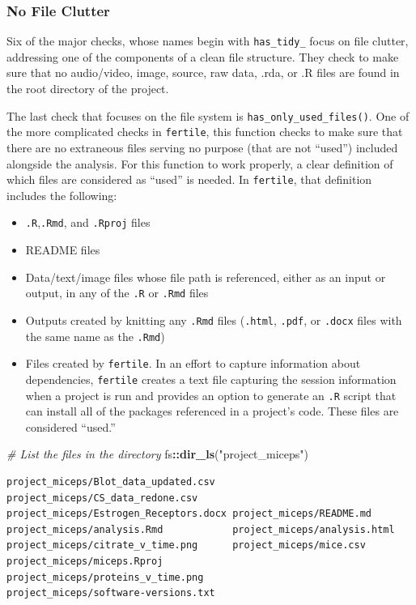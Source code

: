 \documentclass[12pt,twoside]{reedthesis}
\newenvironment{Shaded}{\begin{snugshade}}{\end{snugshade}}
\newcommand{\CommentTok}[1]{\textcolor[rgb]{0.56,0.35,0.01}{\textit{#1}}}
\newcommand{\KeywordTok}[1]{\textcolor[rgb]{0.13,0.29,0.53}{\textbf{#1}}}
\newcommand{\NormalTok}[1]{#1}
\newcommand{\OperatorTok}[1]{\textcolor[rgb]{0.81,0.36,0.00}{\textbf{#1}}}
\newcommand{\StringTok}[1]{\textcolor[rgb]{0.31,0.60,0.02}{#1}}
\providecommand{\tightlist}{%
  \setlength{\itemsep}{0pt}\setlength{\parskip}{0pt}}
\begin{document}
\hypertarget{no-file-clutter}{%
\subsubsection{No File Clutter}\label{no-file-clutter}}

Six of the major checks, whose names begin with \texttt{has\_tidy\_} focus on file clutter, addressing one of the components of a clean file structure. They check to make sure that no audio/video, image, source, raw data, .rda, or .R files are found in the root directory of the project.

The last check that focuses on the file system is \texttt{has\_only\_used\_files()}. One of the more complicated checks in \texttt{fertile}, this function checks to make sure that there are no extraneous files serving no purpose (that are not ``used'') included alongside the analysis. For this function to work properly, a clear definition of which files are considered as ``used'' is needed. In \texttt{fertile}, that definition includes the following:
\begin{itemize}
\tightlist
\item
  \texttt{.R},\texttt{.Rmd}, and \texttt{.Rproj} files
\item
  README files
\item
  Data/text/image files whose file path is referenced, either as an input or output, in any of the \texttt{.R} or \texttt{.Rmd} files
\item
  Outputs created by knitting any \texttt{.Rmd} files (\texttt{.html}, \texttt{.pdf}, or \texttt{.docx} files with the same name as the \texttt{.Rmd})
\item
  Files created by \texttt{fertile}. In an effort to capture information about dependencies, \texttt{fertile} creates a text file capturing the session information when a project is run and provides an option to generate an \texttt{.R} script that can install all of the packages referenced in a project's code. These files are considered ``used.''
\end{itemize}
\begin{Shaded}
\begin{Highlighting}[]
\CommentTok{# List the files in the directory}
\NormalTok{fs}\OperatorTok{::}\KeywordTok{dir_ls}\NormalTok{(}\StringTok{"project_miceps"}\NormalTok{)}
\end{Highlighting}
\end{Shaded}
\begin{verbatim}
project_miceps/Blot_data_updated.csv   project_miceps/CS_data_redone.csv      
project_miceps/Estrogen_Receptors.docx project_miceps/README.md               
project_miceps/analysis.Rmd            project_miceps/analysis.html           
project_miceps/citrate_v_time.png      project_miceps/mice.csv                
project_miceps/miceps.Rproj            project_miceps/proteins_v_time.png     
project_miceps/software-versions.txt   
\end{verbatim}
\end{document}
